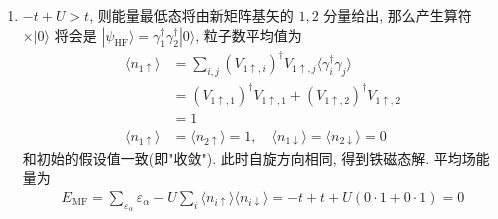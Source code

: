 \documentclass[../../main.tex]{subfiles}
\begin{document}
\begin{enumerate}
\begin{enumerate}
    \item $-t+U > t$, 则能量最低态将由新矩阵基矢的 $1,2$ 分量给出, 那么产生算符 $\times|0\rangle$ 将会是 $|\psi_{\text{HF}}\rangle = \gamma_{1}^{\dagger}\gamma_{2}^{\dagger}|0\rangle$, 粒子数平均值为
    \begin{align*}
      \langle n_{1\uparrow}\rangle &= 
      \sum_{i,j}(V_{1\uparrow,i})^{\dagger}V_{1\uparrow,j}\langle\gamma_{i}^{\dagger}\gamma_{j}\rangle\\
      &= (V_{1\uparrow,1})^{\dagger}V_{1\uparrow,1} + (V_{1\uparrow,2})^{\dagger}V_{1\uparrow,2} \\
      &= 1\\
      \langle n_{1\uparrow}\rangle &= \langle n_{2\uparrow}\rangle = 1,\quad \langle n_{1\downarrow}\rangle = \langle n_{2\downarrow}\rangle = 0
    \end{align*}
    和初始的假设值一致(即"收敛"). 此时自旋方向相同, 得到铁磁态解. 平均场能量为 
    \begin{align*}
      E_{\text{MF}} = \sum_{\varepsilon_{\alpha}}\varepsilon_{\alpha} - U\sum_{i}\langle n_{i\uparrow}\rangle\langle n_{i\downarrow}\rangle = -t + t + U(0\cdot 1 + 0\cdot 1) = 0
    \end{align*}
  \end{enumerate}
  

\end{enumerate}
\end{document}
